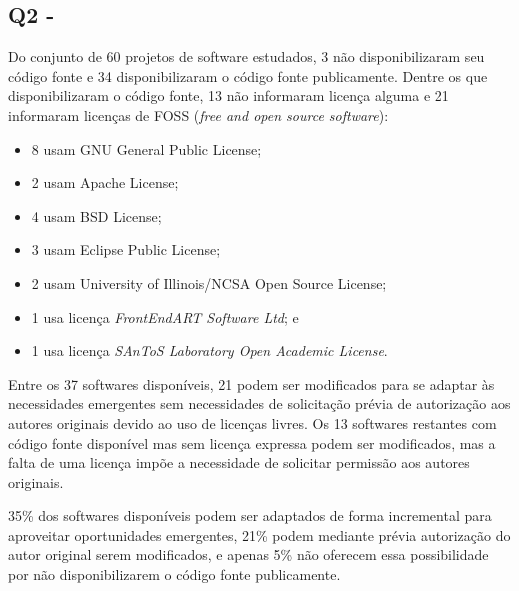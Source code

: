\subsection{Q2 - \EstudoUmQuestaoDois}


Do conjunto de 60 projetos de software estudados, %
3 não disponibilizaram seu código fonte e  %
34 disponibilizaram o código fonte publicamente.
Dentre os que disponibilizaram o código fonte, 13 não informaram licença alguma
e 21 informaram licenças de FOSS ({\it free and open source software}):

\begin{itemize}
  \item 8 usam GNU General Public License;
  \item 2 usam Apache License;
  \item 4 usam BSD License;
  \item 3 usam Eclipse Public License;
  \item 2 usam University of Illinois/NCSA Open Source License;
  \item 1 usa licença {\it FrontEndART Software Ltd}; e
  \item 1 usa licença {\it SAnToS Laboratory Open Academic License}.
\end{itemize}

Entre os 37 softwares disponíveis, 21 podem ser modificados para se adaptar às
necessidades emergentes sem necessidades de solicitação prévia de autorização
aos autores originais devido ao uso de licenças livres. 
Os 13 softwares restantes com código fonte disponível mas sem licença expressa podem
ser modificados, mas a falta de uma licença impõe a necessidade
de solicitar permissão aos autores originais.

35\% dos softwares disponíveis podem ser adaptados de forma incremental para
aproveitar oportunidades emergentes, 21\% podem mediante prévia autorização do
autor original serem modificados, e apenas 5\% não oferecem essa possibilidade
por não disponibilizarem o código fonte publicamente.

